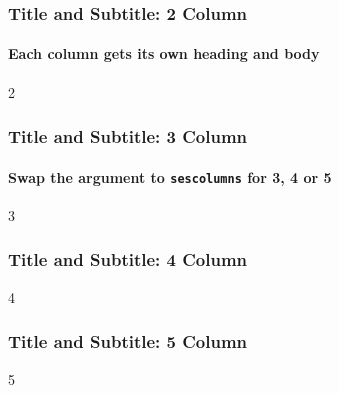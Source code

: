 \begin{seslightframe}
  \frametitle{Title and Subtitle: 2 Column}
  \framesubtitle{Each column gets its own heading and body}
  \begin{sescolumns}{2}
  \end{sescolumns}
\end{seslightframe}

\begin{seslightframe}
  \frametitle{Title and Subtitle: 3 Column}
  \framesubtitle{Swap the argument to \texttt{sescolumns} for 3, 4 or 5}
  \begin{sescolumns}{3}
  \end{sescolumns}
\end{seslightframe}

\begin{seslightframe}
  \frametitle{Title and Subtitle: 4 Column}
  \begin{sescolumns}{4}
  \end{sescolumns}
\end{seslightframe}

\begin{seslightframe}
  \frametitle{Title and Subtitle: 5 Column}
  \begin{sescolumns}{5}
  \end{sescolumns}
\end{seslightframe}

